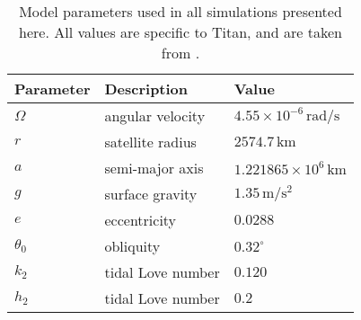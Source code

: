 \begin{table}[!t]
\scriptsize
\centering
\begin{tabularx}{\linewidth}{p{1.5cm} p{2.5cm} p{2.5cm}}
 \toprule
Parameter & Description & Value\\
 \midrule \midrule
$\Omega$ & angular velocity & $4.55 \times 10^{-6} \, \si{\radian\per\second}$\\
$r$ & satellite radius & $2574.7 \, \si{\kilo\metre}$\\
$a$ & semi-major axis & $1.221865 \times 10^6 \, \si{\kilo\metre}$\\
$g$ & surface gravity & $1.35 \, \si{\metre\per\second\squared}$\\
$e$ & eccentricity & $0.0288$\\
$\theta_0$ & obliquity & $0.32^{\circ}$\\
$k_2$ & tidal Love number & $0.120$\\
$h_2$ & tidal Love number & $0.2$\\
 \bottomrule
\end{tabularx}
\caption{Model parameters used in all simulations presented here. All values are specific to Titan, and are taken from \citet{zebker2009size,chen2013tidal}.  \label{tb:param}}
\end{table}